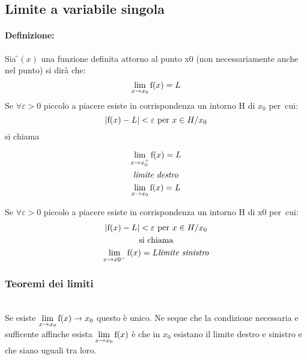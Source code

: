      \subsection{Limite a variabile singola}
      
       \paragraph{Definizione:}
        Sia \f$(x)$ una funzione definita attorno al punto x0 (non necessariamente anche nel punto) si dirà che:
        \[
        \mathop{\lim}\limits_{x \to x_0} \text{f} (x)= L
        \]
        Se $ \forall \varepsilon >0$ piccolo a piacere esiste in corrispondenza un intorno H di $x_0$ per~cui:\\
        \[
        \left|{\text{\text{f}}(x)-L}\right|<\varepsilon \text{ per } x\in H/x_0
        \]
        si chiama 
        
        \begin{gather*}
        \mathop{\lim}\limits_{x \to x_0^+} \text{\text{f}} (x)=L\\
        \text{\textit{limite destro}}\\
        \mathop{\lim}\limits_{x \to x_0} \text{f} (x)= L
        \end{gather*}
        
        Se $ \forall \varepsilon >0$ piccolo a piacere esiste in corrispondenza un intorno H di x0 per~cui:
        \begin{gather*}
        \left|{\text{\text{f}}(x)-L}\right|<\varepsilon \text{ per } x\in H/x_0\\
        \text{si chiama}\\
        \mathop{\lim}\limits_{x \to x0^-} \text{\text{f}} (x)=L 
        \text{\textit{limite sinistro}}
        \end{gather*}
		
		\subsubsection{Teoremi dei limiti}
		 \begin{thm}
		 \textbf{}\\
		  Se esiste $\mathop{\lim}\limits_{x \to x_0}\text{f}(x)\to x_0$ questo è unico. Ne seque che la condizione necessaria e sufficente affinche esista $\mathop{\lim}\limits_{x \to x_0}\text{f}(x)$ è che in $x_0$ esistano il limite destro e sinistro e che siano uguali tra loro.\\
		 \end{thm}
		 
